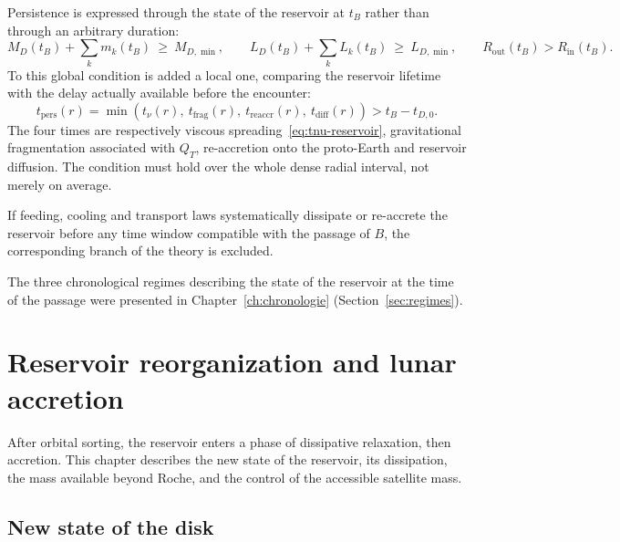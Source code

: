 \documentclass[11pt,a4paper,openany]{report}
\begin{document}
Persistence is expressed through the state of the reservoir at $t_B$ rather than through an
arbitrary duration:
\begin{equation}
M_D(t_B)+\sum_k m_k(t_B)\ \ge\ M_{D,\min},\qquad
L_D(t_B)+\sum_k L_k(t_B)\ \ge\ L_{D,\min},\qquad
R_{\mathrm{out}}(t_B)>R_{\mathrm{in}}(t_B).
\label{eq:persistance}
\end{equation}
To this global condition is added a local one, comparing the reservoir lifetime with the delay
actually available before the encounter:
\begin{equation}
\boxed{\;
t_{\mathrm{pers}}(r)=
\min\!\left(t_\nu(r),\ t_{\mathrm{frag}}(r),\ t_{\mathrm{reaccr}}(r),\ t_{\mathrm{diff}}(r)\right)
>t_B-t_{D,0}.
\;}
\label{eq:tpers}
\end{equation}
The four times are respectively viscous spreading~\eqref{eq:tnu-reservoir}, gravitational
fragmentation associated with $Q_T$, re-accretion onto the proto-Earth and reservoir diffusion. The
condition must hold over the whole dense radial interval, not merely on average.

\begin{falsif}
If feeding, cooling and transport laws systematically dissipate or re-accrete the reservoir before
any time window compatible with the passage of $B$, the corresponding branch of the theory is
excluded.
\end{falsif}

The three chronological regimes describing the state of the reservoir at the time of the passage
were presented in Chapter~\ref{ch:chronologie} (Section~\ref{sec:regimes}).

\chapter{Reservoir reorganization and lunar accretion}
\label{ch:reorganisation}

After orbital sorting, the reservoir enters a phase of dissipative relaxation, then accretion. This
chapter describes the new state of the reservoir, its dissipation, the mass available beyond Roche,
and the control of the accessible satellite mass.

\section{New state of the disk}
\end{document}
